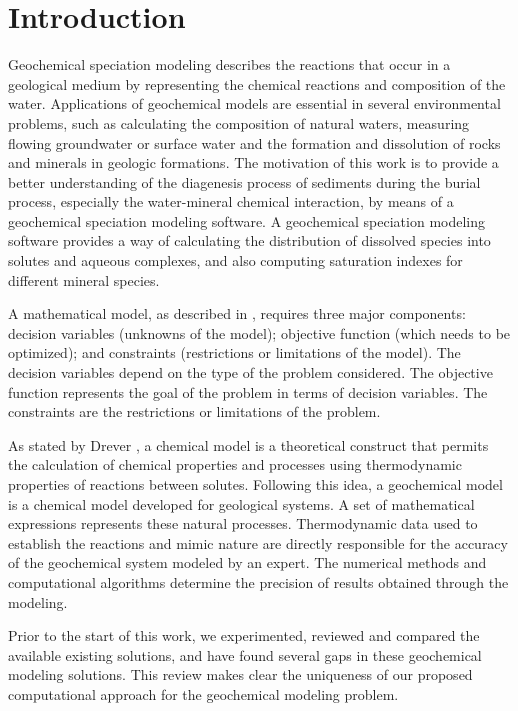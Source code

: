 \chapter{Introduction} 
\label{chapter:intro}


Geochemical speciation modeling describes the reactions that occur in a geological medium by representing the chemical reactions and composition of the water. Applications of geochemical models are essential in several environmental problems, such as calculating the composition of natural waters, measuring flowing groundwater or surface water and the formation and dissolution of rocks and minerals in geologic formations. The motivation of this work is to provide a better understanding of the diagenesis process of sediments during the burial process, especially the water-mineral chemical interaction, by means of a geochemical speciation modeling software. A geochemical speciation modeling software provides a way of calculating the distribution of dissolved species into solutes and aqueous complexes, and also computing saturation indexes for different mineral species. 


A mathematical model, as described in \cite{Sarker:08}, requires three major components: decision variables (unknowns of the model); objective function (which needs to be optimized); and constraints (restrictions or limitations of the model). 
The decision variables depend on the type of the problem considered.  The objective function represents the goal of the problem in terms of decision variables. The constraints are the restrictions or limitations of the problem.

As stated by Drever \cite{Drever:05}, a chemical model is a theoretical construct that permits the calculation of chemical properties and processes using thermodynamic properties of reactions between solutes. Following this idea, a geochemical model is a chemical model developed for geological systems. A set of mathematical expressions represents these natural processes. Thermodynamic data used to establish the reactions and mimic nature are directly responsible for the accuracy of the geochemical system modeled by an expert. The numerical methods and computational algorithms determine the precision of results obtained through the modeling.


Prior to the start of this work, we experimented, reviewed and compared the available existing solutions, and have found several gaps in these geochemical modeling solutions. This review makes clear the uniqueness of our proposed computational approach for the geochemical modeling problem.

